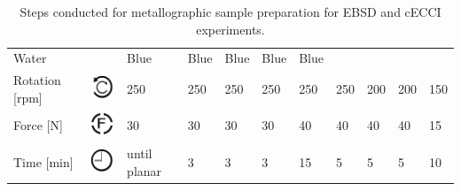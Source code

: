 \documentclass{article}
\begin{document}
\begin{table}
\begin{tabular}{|lr|lr|lr|lr|lr|lr|lr|lr|lr|lr|}
\multicolumn{2}{l|}{Water} & \multicolumn{2}{l|}{Blue} & \multicolumn{2}{l|}{Blue} &
\multicolumn{2}{l|}{Blue} & \multicolumn{2}{l|}{Blue} & \multicolumn{2}{l|}{Blue} 
\\ \cline{1-20} %
Rotation {[}rpm{]}& \includegraphics[valign=m]{Symbols_SVG/Rotation} & 
\multicolumn{2}{l|}{250} & \multicolumn{2}{l|}{250} & \multicolumn{2}{l|}{250} &
\multicolumn{2}{l|}{250} & \multicolumn{2}{l|}{250} & \multicolumn{2}{l|}{250} &
\multicolumn{2}{l|}{200} & \multicolumn{2}{l|}{200} & \multicolumn{2}{l|}{150} 
\\ \cline{1-20} %
Force {[}N{]} & \includegraphics[valign=m]{Symbols_SVG/Force} & 
\multicolumn{2}{l|}{30} & \multicolumn{2}{l|}{30} & \multicolumn{2}{l|}{30} &
\multicolumn{2}{l|}{30} & \multicolumn{2}{l|}{40} & \multicolumn{2}{l|}{40} &
\multicolumn{2}{l|}{40} & \multicolumn{2}{l|}{40} & \multicolumn{2}{l|}{15} 
\\ \cline{1-20} %
Time {[}min{]} & \includegraphics[valign=m]{Symbols_SVG/Clock_symbol} & 
\multicolumn{2}{l|}{until planar} & \multicolumn{2}{l|}{3} & \multicolumn{2}{l|}{3} &
\multicolumn{2}{l|}{3} & \multicolumn{2}{l|}{15} & \multicolumn{2}{l|}{5} &
\multicolumn{2}{l|}{5} & \multicolumn{2}{l|}{5} & \multicolumn{2}{l|}{10} 
\\ \cline{1-20}
\end{tabular}
\caption[Sample preparation]{Steps conducted for metallographic sample preparation for EBSD and cECCI experiments.}
\label{tab: SamplePrep}
\end{table}
\end{document}

